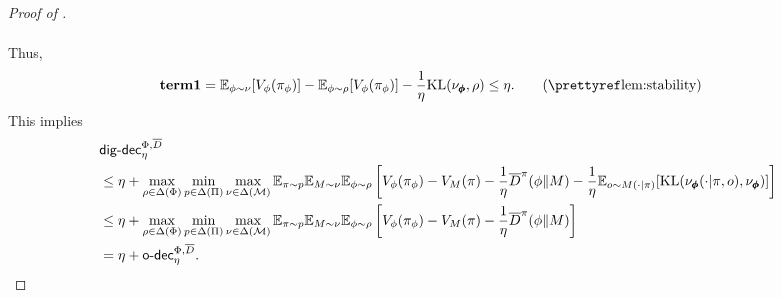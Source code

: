 \begin{proof}[Proof of ]
\begin{align*}
\end{align*}


Thus, 
\begin{align*}
    &\textbf{term1}
    = \E_{\phi\sim \nu}[V_\phi(\pi_\phi)] - \E_{\phi\sim \rho}[V_\phi(\pi_\phi)] - \frac{1}{\eta} \KL(\nu_{\bo{\phi}}, \rho)\leq \eta.  \tag{\pref{lem:stability}}
\end{align*}
This implies
\begin{align*}
    &\mathsf{dig}\text{-}\mathsf{dec}_\eta^{\Phi,\overline{D}} \\
    &\le \eta + \max_{\rho\in\Delta(\Phi)} \min_{p\in\Delta(\Pi)} \max_{\nu\in \Delta(\mathcal{M})} \mathbb{E}_{\pi\sim p}\mathbb{E}_{M\sim \nu}\mathbb{E}_{\phi \sim \rho}\left[ V_{\phi}(\pi_\phi) - V_M(\pi)- \frac{1}{\eta} \overline{D}^\pi(\phi\|M) - \frac{1}{\eta} \mathbb{E}_{o\sim M(\cdot|\pi)} [\text{KL}(\nu_{\pmb{\phi}}(\cdot|\pi, o), \nu_{\pmb{\phi}})] \right] \\
    &\leq \eta +\max_{\rho\in\Delta(\Phi)} \min_{p\in\Delta(\Pi)} \max_{\nu\in \Delta(\mathcal{M})} \mathbb{E}_{\pi\sim p}\mathbb{E}_{M\sim \nu}\mathbb{E}_{\phi \sim \rho}\left[ V_{\phi}(\pi_\phi) - V_M(\pi)- \frac{1}{\eta} \overline{D}^\pi(\phi\|M) \right] \\
    &= \eta + \mathsf{o}\text{-}\mathsf{dec}^{\Phi,\overline{D}}_\eta. 
\end{align*}
\end{proof}




